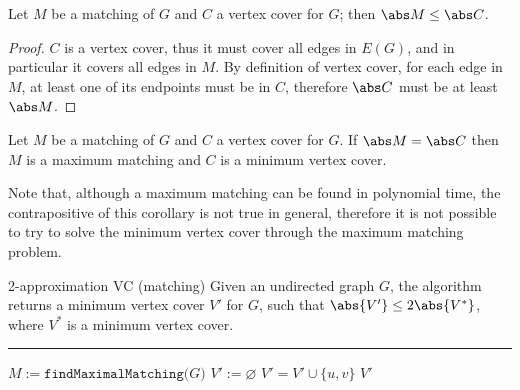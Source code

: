 \documentclass[a4paper, 12pt]{report}
\begin{document}
    \begin{framedthm}[label={bounded_matching}]{}
        Let $M$ be a matching of $G$ and $C$ a vertex cover for $G$; then $\abs M \le \abs C$.
    \end{framedthm}

    \begin{proof}
        $C$ is a vertex cover, thus it must cover all edges in $E(G)$, and in particular it covers all edges in $M$. By definition of vertex cover, for each edge in $M$, at least one of its endpoints must be in $C$, therefore $\abs C$ must be at least $\abs M$.
    \end{proof}

    \begin{framedcor}{}
        Let $M$ be a matching of $G$ and $C$ a vertex cover for $G$. If $\abs M = \abs C$ then $M$ is a maximum matching and $C$ is a minimum vertex cover.
    \end{framedcor}

    Note that, although a maximum matching can be found in polynomial time, the contrapositive of this corollary is not true in general, therefore it is not possible to try to solve the minimum vertex cover through the maximum matching problem.

    \begin{framedalgo}{2-approximation VC (matching)}
        Given an undirected graph $G$, the algorithm returns a minimum vertex cover $V'$ for $G$, such that $\abs{V'} \le 2 \abs {V^*}$, where $V^*$ is a minimum vertex cover. \\
        \hrule

        \quad
        \label{alg:2-approx_vc_matching}
        \begin{algorithmic}[1]
                \State $M := \texttt{findMaximalMatching(}G\texttt{)}$
                \State $V' := \varnothing$
                    \State $V' = V' \cup \{u, v\}$
                \EndFor
                \State {} $V'$
            \EndFunction
        \end{algorithmic}
    \end{framedalgo}


\end{document}
